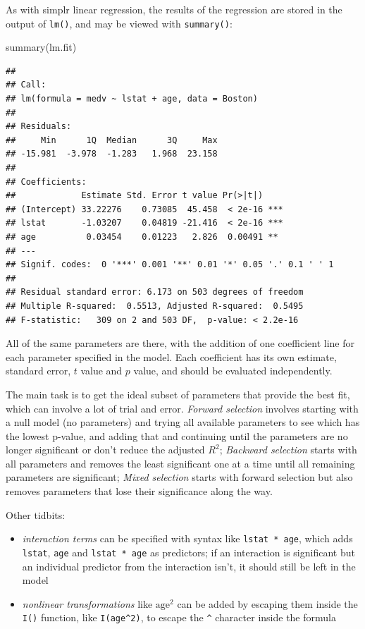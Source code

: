 \documentclass[
]{book}
\newenvironment{Shaded}{\begin{snugshade}}{\end{snugshade}}
\newcommand{\FunctionTok}[1]{\textcolor[rgb]{0.00,0.00,0.00}{#1}}
\newcommand{\NormalTok}[1]{#1}
\providecommand{\tightlist}{%
  \setlength{\itemsep}{0pt}\setlength{\parskip}{0pt}}
\begin{document}
As with simplr linear regression, the results of the regression are stored in the output of \texttt{lm()}, and may be viewed with \texttt{summary()}:

\begin{Shaded}
\begin{Highlighting}[]
\FunctionTok{summary}\NormalTok{(lm.fit)}
\end{Highlighting}
\end{Shaded}

\begin{verbatim}
## 
## Call:
## lm(formula = medv ~ lstat + age, data = Boston)
## 
## Residuals:
##     Min      1Q  Median      3Q     Max 
## -15.981  -3.978  -1.283   1.968  23.158 
## 
## Coefficients:
##             Estimate Std. Error t value Pr(>|t|)    
## (Intercept) 33.22276    0.73085  45.458  < 2e-16 ***
## lstat       -1.03207    0.04819 -21.416  < 2e-16 ***
## age          0.03454    0.01223   2.826  0.00491 ** 
## ---
## Signif. codes:  0 '***' 0.001 '**' 0.01 '*' 0.05 '.' 0.1 ' ' 1
## 
## Residual standard error: 6.173 on 503 degrees of freedom
## Multiple R-squared:  0.5513, Adjusted R-squared:  0.5495 
## F-statistic:   309 on 2 and 503 DF,  p-value: < 2.2e-16
\end{verbatim}

All of the same parameters are there, with the addition of one coefficient line for each parameter specified in the model. Each coefficient has its own estimate, standard error, \(t\) value and \(p\) value, and should be evaluated independently.

The main task is to get the ideal subset of parameters that provide the best fit, which can involve a lot of trial and error. \emph{Forward selection} involves starting with a null model (no parameters) and trying all available parameters to see which has the lowest p-value, and adding that and continuing until the parameters are no longer significant or don't reduce the adjusted \(R^2\); \emph{Backward selection} starts with all parameters and removes the least significant one at a time until all remaining parameters are significant; \emph{Mixed selection} starts with forward selection but also removes parameters that lose their significance along the way.

Other tidbits:

\begin{itemize}
\tightlist
\item
  \emph{interaction terms} can be specified with syntax like \texttt{lstat\ *\ age}, which adds \texttt{lstat}, \texttt{age} and \texttt{lstat\ *\ age} as predictors; if an interaction is significant but an individual predictor from the interaction isn't, it should still be left in the model
\item
  \emph{nonlinear transformations} like \(\text{age}^2\) can be added by escaping them inside the \texttt{I()} function, like \texttt{I(age\^{}2)}, to escape the \texttt{\^{}} character inside the formula
\end{itemize}
\end{document}
